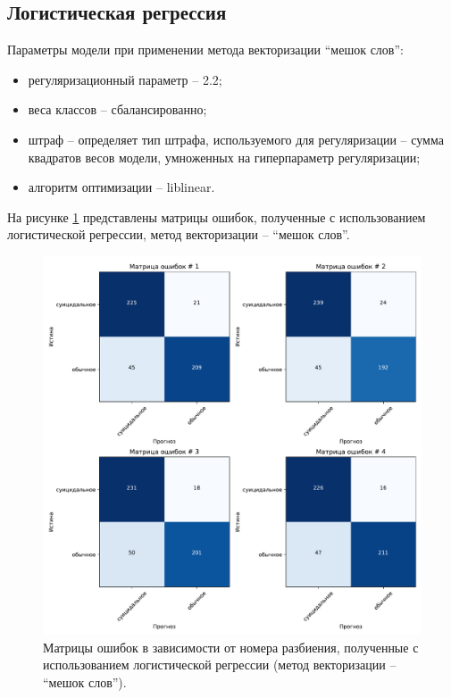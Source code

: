 \subsection{Логистическая регрессия }

Параметры модели при применении метода векторизации ``мешок слов'':
\begin{itemize}
	\item регуляризационный параметр -- 2.2;
	\item веса классов -- сбалансированно;
	\item штраф -- определяет тип штрафа, используемого для регуляризации -- сумма квадратов весов модели, умноженных на гиперпараметр регуляризации;
	\item алгоритм оптимизации -- liblinear.
\end{itemize}

На рисунке \ref{img:logicMatrBag} представлены матрицы ошибок, полученные с использованием логистической регрессии, метод векторизации -- ``мешок слов''.
\begin{figure}[H]
	\centering
	\includegraphics[width=\textwidth]{inc/plots/logicMatrBag.pdf}
	\caption{ Матрицы ошибок в зависимости от номера разбиения, полученные с использованием логистической регрессии (метод векторизации -- ``мешок слов''). }
	\label{img:logicMatrBag}
\end{figure}


